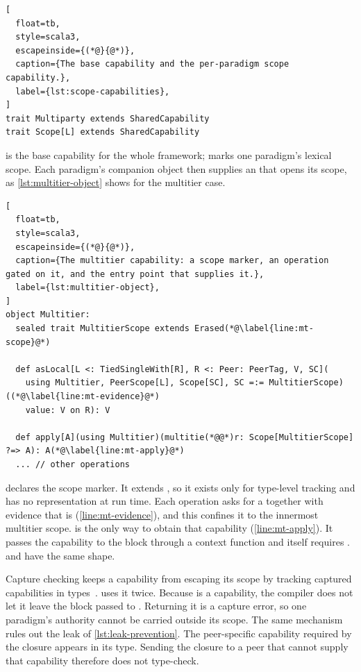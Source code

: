 \begin{lstlisting}[
  float=tb,
  style=scala3,
  escapeinside={(*@}{@*)},
  caption={The base capability and the per-paradigm scope capability.},
  label={lst:scope-capabilities},
]
trait Multiparty extends SharedCapability
trait Scope[L] extends SharedCapability
\end{lstlisting}

 is the base capability for the whole framework;
 marks one paradigm's lexical scope.
%
Each paradigm's companion object then supplies an  that opens its scope,
as \cref{lst:multitier-object} shows for the multitier case.

\begin{lstlisting}[
  float=tb,
  style=scala3,
  escapeinside={(*@}{@*)},
  caption={The multitier capability: a scope marker, an operation gated on it, and the entry point that supplies it.},
  label={lst:multitier-object},
]
object Multitier:
  sealed trait MultitierScope extends Erased(*@\label{line:mt-scope}@*)

  def asLocal[L <: TiedSingleWith[R], R <: Peer: PeerTag, V, SC](
    using Multitier, PeerScope[L], Scope[SC], SC =:= MultitierScope)((*@\label{line:mt-evidence}@*)
    value: V on R): V

  def apply[A](using Multitier)(multitie(*@@*)r: Scope[MultitierScope] ?=> A): A(*@\label{line:mt-apply}@*)
  ... // other operations
\end{lstlisting}

 declares the scope marker.
%
It extends , so it exists only for type-level tracking and has no representation at run time.
%
Each operation asks for a  together with evidence that  is  (\cref{line:mt-evidence}),
and this confines it to the innermost multitier scope.
%
 is the only way to obtain that capability (\cref{line:mt-apply}).
It passes the capability to the block through a context function and itself requires .
%
 and  have the same shape.

Capture checking keeps a capability from escaping its scope
by tracking captured capabilities in types~\cite{DBLP:journals/toplas/BoruchGruszeckiOLLB23}.
%
\camil uses it twice.
%
Because  is a capability, the compiler does not let it leave the block passed to .
Returning it is a capture error,
so one paradigm's authority cannot be carried outside its scope.
%
The same mechanism rules out the leak of \cref{lst:leak-prevention}.
The peer-specific capability required by the closure appears in its type.
Sending the closure to a peer that cannot supply that capability therefore does not type-check.

